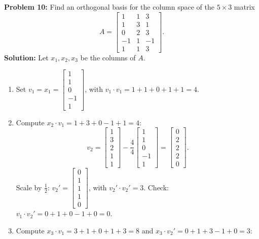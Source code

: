 \documentclass[11pt, letterpaper]{article}
\theoremstyle{definition}
\theoremstyle{remark}
\begin{document}
\textbf{Problem 10:} Find an orthogonal basis for the column space of the $5 \times 3$ matrix
\[
    A = \begin{bmatrix}
        1 & 1 & 3 \\
        1 & 3 & 1 \\
        0 & 2 & 3 \\
        -1 & 1 & -1 \\
        1 & 1 & 3
    \end{bmatrix}.
\]
\textbf{Solution:} Let $x_1, x_2, x_3$ be the columns of $A$.
\begin{enumerate}[label=\textbf{Step \arabic*:}]
    \item Set $v_1 = x_1 = \begin{bmatrix} 1 \\ 1 \\ 0 \\ -1 \\ 1 \end{bmatrix}$, with $v_1 \cdot v_1 = 1 + 1 + 0 + 1 + 1 = 4$.
    \item Compute $x_2 \cdot v_1 = 1 + 3 + 0 - 1 + 1 = 4$:
    \[
        v_2 = \begin{bmatrix} 1 \\ 3 \\ 2 \\ 1 \\ 1 \end{bmatrix} - \frac{4}{4}\begin{bmatrix} 1 \\ 1 \\ 0 \\ -1 \\ 1 \end{bmatrix} = \begin{bmatrix} 0 \\ 2 \\ 2 \\ 2 \\ 0 \end{bmatrix}.
    \]
    Scale by $\frac{1}{2}$: $v_2' = \begin{bmatrix} 0 \\ 1 \\ 1 \\ 1 \\ 0 \end{bmatrix}$, with $v_2' \cdot v_2' = 3$. Check: $v_1 \cdot v_2' = 0 + 1 + 0 - 1 + 0 = 0$.
    \item Compute $x_3 \cdot v_1 = 3 + 1 + 0 + 1 + 3 = 8$ and $x_3 \cdot v_2' = 0 + 1 + 3 - 1 + 0 = 3$:

\end{enumerate}
\end{document}
